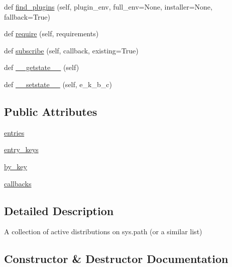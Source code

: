 \begin{DoxyCompactItemize}
\item 
def \hyperlink{classpip_1_1__vendor_1_1pkg__resources_1_1WorkingSet_a60d3acb4eda7ccfc93f14003ea0bca90}{find\+\_\+plugins} (self, plugin\+\_\+env, full\+\_\+env=None, installer=None, fallback=True)
\item 
def \hyperlink{classpip_1_1__vendor_1_1pkg__resources_1_1WorkingSet_a578e5a938047f53986c4eb860621e367}{require} (self, requirements)
\item 
def \hyperlink{classpip_1_1__vendor_1_1pkg__resources_1_1WorkingSet_a1e0b3684618e31c481f4adcb5736c73f}{subscribe} (self, callback, existing=True)
\item 
def \hyperlink{classpip_1_1__vendor_1_1pkg__resources_1_1WorkingSet_a02db0d73e2f0953c1ef796c394ef0d06}{\+\_\+\+\_\+getstate\+\_\+\+\_\+} (self)
\item 
def \hyperlink{classpip_1_1__vendor_1_1pkg__resources_1_1WorkingSet_a7402447ac24f63d9c8eabca4bab97267}{\+\_\+\+\_\+setstate\+\_\+\+\_\+} (self, e\+\_\+k\+\_\+b\+\_\+c)
\end{DoxyCompactItemize}
\subsection*{Public Attributes}
\begin{DoxyCompactItemize}
\item 
\hyperlink{classpip_1_1__vendor_1_1pkg__resources_1_1WorkingSet_adf875e5065f4e84a53bb40c44a05fd9b}{entries}
\item 
\hyperlink{classpip_1_1__vendor_1_1pkg__resources_1_1WorkingSet_a7efc04fc51d0be5b9c298f804728826b}{entry\+\_\+keys}
\item 
\hyperlink{classpip_1_1__vendor_1_1pkg__resources_1_1WorkingSet_a76d4666c9b3e10cacb5dfc4b3d8b4d6d}{by\+\_\+key}
\item 
\hyperlink{classpip_1_1__vendor_1_1pkg__resources_1_1WorkingSet_a209d40caf76c505bfec1f4c1ea1717a3}{callbacks}
\end{DoxyCompactItemize}


\subsection{Detailed Description}
\begin{DoxyVerb}A collection of active distributions on sys.path (or a similar list)\end{DoxyVerb}
 

\subsection{Constructor \& Destructor Documentation}
\mbox{\label{classpip_1_1__vendor_1_1pkg__resources_1_1WorkingSet_aee67aa919c47a87f7c44fa8c53513388}} 
